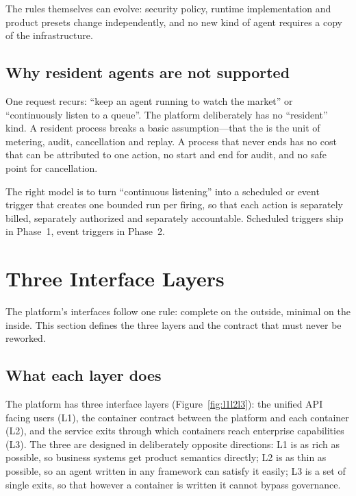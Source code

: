 The rules themselves can evolve: security policy, runtime implementation and product presets change independently, and no new kind of agent requires a copy of the infrastructure.

\subsection{Why resident agents are not supported}

One request recurs: ``keep an agent running to watch the market'' or ``continuously listen to a queue''. The platform deliberately has no ``resident'' kind. A resident process breaks a basic assumption---that the  is the unit of metering, audit, cancellation and replay. A process that never ends has no cost that can be attributed to one action, no start and end for audit, and no safe point for cancellation.

The right model is to turn ``continuous listening'' into a scheduled or event trigger that creates one bounded run per firing, so that each action is separately billed, separately authorized and separately accountable. Scheduled triggers ship in Phase~1, event triggers in Phase~2.

\section{Three Interface Layers}
\label{sec:interfaces}

The platform's interfaces follow one rule: complete on the outside, minimal on the inside. This section defines the three layers and the contract that must never be reworked.

\subsection{What each layer does}

The platform has three interface layers (Figure~\ref{fig:l1l2l3}): the unified API facing users (L1), the container contract between the platform and each container (L2), and the service exits through which containers reach enterprise capabilities (L3). The three are designed in deliberately opposite directions: L1 is as rich as possible, so business systems get product semantics directly; L2 is as thin as possible, so an agent written in any framework can satisfy it easily; L3 is a set of single exits, so that however a container is written it cannot bypass governance.

